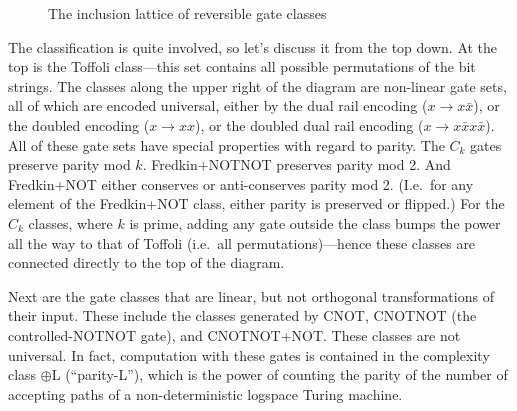 \documentclass[11pt]{report}
\theoremstyle{plain}
\theoremstyle{definition}
\newcommand{\NOTNOT}{\operatorname{NOTNOT}}
\newcommand{\Fredkin}{\operatorname{Fredkin}}
\begin{document}
\begin{figure}[ptb]
\begin{center}
\end{center}
\caption{The inclusion lattice of reversible gate classes}%
\label{ReversibleFigure}
\end{figure}

The classification is quite involved, so let's discuss it from the top down. At the top is the Toffoli class---this set contains all possible permutations of the bit strings. The classes along the upper right of the diagram are non-linear gate sets, all of which are encoded universal, either by the dual rail encoding ($x\rightarrow x\bar{x}$), or the doubled encoding ($x\rightarrow xx$), or the doubled dual rail encoding ($x\rightarrow x\bar{x}x\bar{x}$). All of these gate sets have special properties with regard to parity. The $C_k$ gates preserve parity mod $k$. Fredkin+NOTNOT preserves parity mod 2. And Fredkin+NOT either conserves or anti-conserves parity mod 2. (I.e.\ for any element of the Fredkin+NOT class, either parity is preserved or flipped.) For the $C_k$ classes, where $k$ is prime, adding any gate outside the class bumps the power all the way to that of Toffoli (i.e.\ all permutations)---hence these classes are connected directly to the top of the diagram.

Next are the gate classes that are linear, but not orthogonal transformations of their input. These include the classes generated by CNOT, CNOTNOT (the controlled-NOTNOT gate), and CNOTNOT+NOT.  These classes are not universal. In fact, computation with these gates is contained in the complexity class $\oplus$\textsf{L} (``parity-L''), which is the power of counting the parity of the number of accepting paths of a non-deterministic logspace Turing machine.
\end{document}
